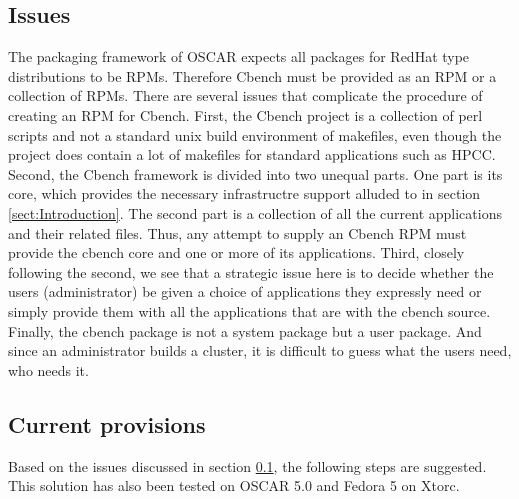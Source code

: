 \documentclass[pdftex,10pt]{article}
\begin{document}
\subsection{Issues}
\label{sect:Issues}
The packaging framework of OSCAR expects all packages for RedHat type distributions to be RPMs. Therefore Cbench must be provided as an RPM or a collection of RPMs. There are several issues that complicate the procedure of creating an RPM for Cbench. First, the Cbench project is a collection of perl scripts and not a standard unix build environment of makefiles, even though the project does contain a lot of makefiles for standard applications such as HPCC. Second, the Cbench framework is divided into two unequal parts. One part is its core, which provides the necessary infrastructre support alluded to in section \ref{sect:Introduction}. The second part is a collection of all the current applications and their related files. Thus, any attempt to supply an Cbench RPM must provide the cbench core and one or more of its applications. Third, closely following the second, we see that a strategic issue here is to decide whether the users (administrator) be given a choice of applications they expressly need or simply provide them with all the applications that are with the cbench source. Finally, the cbench package is not a system package but a user package. And since an administrator builds a cluster, it is difficult to guess what the users need, who needs it.

\subsection{Current provisions}
Based on the issues discussed in section \ref{sect:Issues}, the following steps are suggested. This solution has also been tested on OSCAR 5.0 and Fedora 5 on Xtorc.
\end{document}
